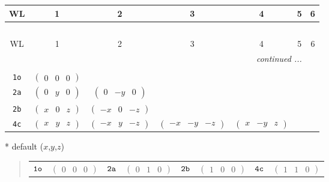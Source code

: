 \documentclass[fleqn,9pt,landscape]{jsarticle}
\begin{document}
\begin{center}
\renewcommand{\arraystretch}{1.2}
\begin{longtable}{ccccccc}
 \hline \hline
WL & 1 & 2 & 3 & 4 & 5 & 6 \\ \hline \endfirsthead

\multicolumn{6}{l}{\tablename\ \thetable{}} \\
 \hline \hline
WL & 1 & 2 & 3 & 4 & 5 & 6 \\ \hline \endhead

 \hline \hline
\multicolumn{6}{r}{\footnotesize\it continued ...} \\ \endfoot

 \hline \hline
\multicolumn{6}{r}{} \\ \endlastfoot

{\tt 1o} & $ \begin{pmatrix} 0 & 0 & 0 \end{pmatrix} $ & $  $ & $  $ & $  $ \\ \hline
{\tt 2a} & $ \begin{pmatrix} 0 & y & 0 \end{pmatrix} $ & $ \begin{pmatrix} 0 & - y & 0 \end{pmatrix} $ & $  $ & $  $ \\ \hline
{\tt 2b} & $ \begin{pmatrix} x & 0 & z \end{pmatrix} $ & $ \begin{pmatrix} - x & 0 & - z \end{pmatrix} $ & $  $ & $  $ \\ \hline
{\tt 4c} & $ \begin{pmatrix} x & y & z \end{pmatrix} $ & $ \begin{pmatrix} - x & y & - z \end{pmatrix} $ & $ \begin{pmatrix} - x & - y & - z \end{pmatrix} $ & $ \begin{pmatrix} x & - y & z \end{pmatrix} $ \\
\end{longtable}
\end{center}
* default ($x$,$y$,$z$)
\begin{quote}
\begin{tabular}{cccccccc}
$ {\tt 1o} $ & $ \begin{pmatrix} 0 & 0 & 0 \end{pmatrix} $ & $ {\tt 2a} $ & $ \begin{pmatrix} 0 & 1 & 0 \end{pmatrix} $ & $ {\tt 2b} $ & $ \begin{pmatrix} 1 & 0 & 0 \end{pmatrix} $ & $ {\tt 4c} $ & $ \begin{pmatrix} 1 & 1 & 0 \end{pmatrix} $
\end{tabular}
\end{quote}
\end{document}
